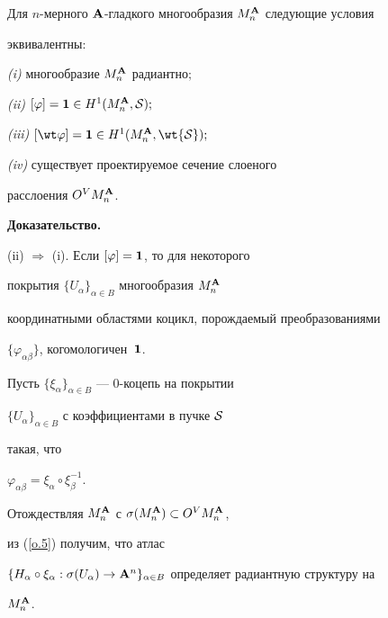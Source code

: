 \begin{thm}


Для $n$-мерного ${\bold A}$-гладкого многообразия $M^{\bold A}_n$ следующие условия


эквивалентны\/${:}$





{\em (i)} многообразие  $M^{\bold A}_n$  радиантно\/$;$





{\em (ii)} $[\varphi] ={\bold 1} \in H^1 (M^{\bold A}_n, {\cal S});$





{\em (iii)} $[\wt\varphi] = {\bold 1} \in H^1 (M^\A_n, {\wt{\cal S}});$





{\em (iv)} существует проектируемое сечение слоеного


расслоения $O^VM^{\bold A}_n$.


\end{thm}








{\bf Доказательство.}


(ii) $\Rightarrow$ (i). Если $[\varphi]={\bold 1}$, то для некоторого


покрытия $\{U_\alpha\}_{\alpha \in B}$ многообразия $M^{\bold A}_n$


координатными областями коцикл, порождаемый преобразованиями


$\{\varphi_{\alpha\beta}\}$, когомологичен~${\bold 1}$.


Пусть $\{\xi_{\alpha}\}_{\alpha \in B}$ --- $0$-коцепь на покрытии


$\{U_\alpha\}_{\alpha \in B}$ с коэффициентами в пучке ${\cal S}$


такая, что


$\varphi_{\alpha\beta}=\xi_{\alpha}\circ \xi_{\beta}^{-1}$.


Отождествляя $M^{\bold A}_n$ с $\sigma(M^{\bold A}_n)\subset O^VM^{\bold A}_n$,


из (\ref{o.5}) получим, что атлас


$\{H_\alpha\circ\xi_\alpha:\sigma(U_\alpha)\to


\A^n\}_{\alpha \in B}$ определяет радиантную структуру на


$M^{\bold A}_n$.





